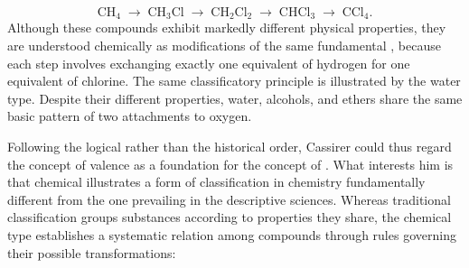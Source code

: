 \documentclass[submitted,12pt]{article}
\providecommand{\DIFdelbegin}{} %
\begin{document}
\[
\mathrm{CH}_4
\;\longrightarrow\;
\mathrm{CH}_3\mathrm{Cl}
\;\longrightarrow\;
\mathrm{CH}_2\mathrm{Cl}_2
\;\longrightarrow\;
\mathrm{CHCl}_3
\;\longrightarrow\;
\mathrm{CCl}_4.
\]
%
Although these compounds exhibit markedly different physical properties, they are understood chemically as modifications of the same fundamental , because each step involves exchanging exactly one equivalent of hydrogen for one equivalent of chlorine. The same classificatory principle is illustrated by the water type. Despite their different properties, water, alcohols, and ethers share the same basic pattern of two attachments to oxygen.

Following the logical rather than the historical order, Cassirer could thus regard the concept of valence as a foundation for the concept of . What interests him is that chemical  illustrates a form of classification in chemistry fundamentally different from the one prevailing in the descriptive sciences. Whereas traditional classification groups substances according to properties they share, the chemical type establishes a systematic relation among compounds through rules governing their possible transformations: 
%
\DIFdelbegin %
\end{document}
